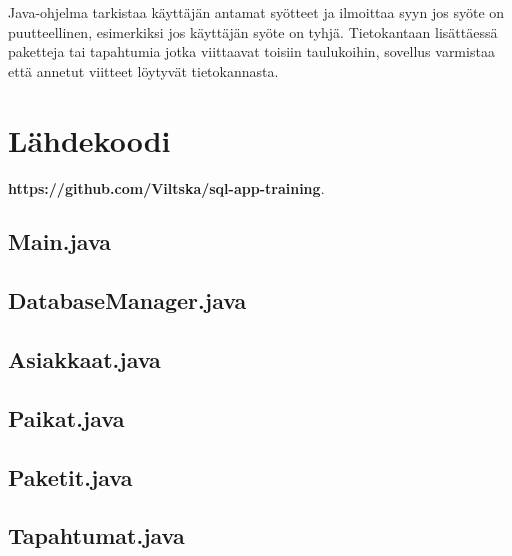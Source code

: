\documentclass[11pt,a4paper]{article}
\begin{document}
Java-ohjelma tarkistaa käyttäjän antamat syötteet ja ilmoittaa syyn jos syöte on puutteellinen, esimerkiksi jos käyttäjän syöte on tyhjä. Tietokantaan lisättäessä paketteja tai tapahtumia jotka viittaavat toisiin taulukoihin, sovellus varmistaa että annetut viitteet löytyvät tietokannasta.

\newpage
\section{Lähdekoodi}
\pagestyle{empty}
\textbf{https://github.com/Viltska/sql-app-training}.

\subsection*{Main.java}

\subsection*{DatabaseManager.java}


\subsection*{Asiakkaat.java}

\subsection*{Paikat.java}

\subsection*{Paketit.java}

\subsection*{Tapahtumat.java}

\end{document}

